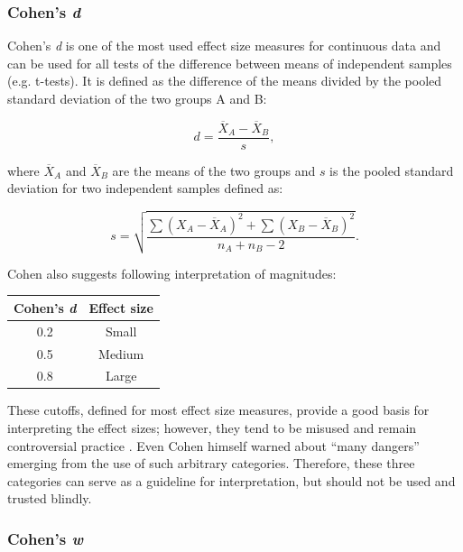 \subsubsection{Cohen's \textit{d}}

Cohen's \textit{d} is one of the most used effect size measures for continuous data and can be used for all tests of the difference between means of independent samples (e.g. t-tests). It is defined as the difference of the means divided by the pooled standard deviation of the two groups A and B: \cite{cohen_book}

\begin{equation}
d = \frac{\overline{X}_A-\overline{X}_B}{s} ,
\end{equation}

where $\overline{X}_A$ and $\overline{X}_B$ are the means of the two groups and $s$ is the pooled standard deviation for two independent samples defined as:

\begin{equation}
s = \sqrt{\frac{\sum{\left( X_A-\overline{X}_A \right)^2} + \sum{\left( X_B-\overline{X}_B \right)^2}}{n_A+n_B-2}} .
\end{equation}

Cohen \cite{cohen_book} also suggests following interpretation of magnitudes:

\begin{table}[!h] \centering
\begin{tabular}{cc}
\hline
Cohen's \textit{d} & Effect size \\ \hline
0.2                & Small       \\
0.5                & Medium      \\
0.8                & Large       \\ \hline
\end{tabular}
\end{table}

These cutoffs, defined for most effect size measures, provide a good basis for interpreting the effect sizes; however, they tend to be misused and remain controversial practice \cite{effect_sizes}. Even Cohen himself warned about ``many dangers'' emerging from the use of such arbitrary categories. Therefore, these three categories can serve as a guideline for interpretation, but should not be used and trusted blindly.


\subsubsection{Cohen's \textit{w}}

